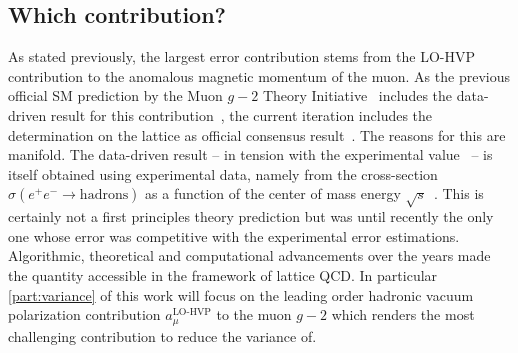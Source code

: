 \subsection{Which contribution?}


As stated previously, the largest error contribution stems from the LO-HVP contribution to the anomalous magnetic momentum of the muon.
As the previous official SM prediction by the Muon $g-2$ Theory Initiative~\cite{online:gm2} includes the data-driven result for this contribution~\cite{snowmass:2020}, the current iteration includes the determination on the lattice as official consensus result~\cite{snowmass:2025}.
The reasons for this are manifold.
The data-driven result -- in tension with the experimental value~\cite{Muong-2:2006rrc,Muong-2:2021ojo} -- is itself obtained using experimental data, namely from the cross-section $\sigma(e^{+} e^{-} \rightarrow \text{hadrons})$ as a function of the center of mass energy $\sqrt{s}$~\cite{davier:2017zfy,keshavarzi:2018mgv,colangelo:2018mtw,hoferichter:2019mqg,davier:2019can,keshavarzi:2019abf}.
This is certainly not a first principles theory prediction but was until recently the only one whose error was competitive with the experimental error estimations.
Algorithmic, theoretical and computational advancements over the years made the quantity accessible in the framework of lattice QCD.
In particular \cref{part:variance} of this work will focus on the leading order hadronic vacuum polarization contribution $a_{\mu}^{\text{LO-HVP}}$ to the muon $g-2$ which renders the most challenging contribution to reduce the variance of.

